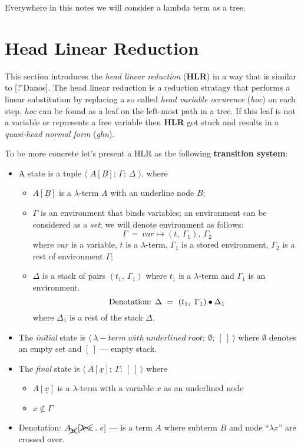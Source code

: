 \documentclass[a4paper, 10pt]{article}
\newcommand{\InContext}[2]{{#1}\left[{#2}\right]}
\begin{document}
Everywhere in this notes we will consider a lambda term as a tree.

\section{Head Linear Reduction}

This section introduces the \emph{head linear reduction} (\textbf{HLR}) in a way that
is similar to [?'Danos].
The head linear reduction is a reduction stratagy that performs a linear substitution
by replacing a so called \emph{head variable occurence} (\emph{hoc}) on each step.
\emph{hoc} can be found as a leaf on the left-most path in a tree. If this leaf is not
a variable or represents a free variable then \textbf{HLR} got stuck and results in a
\emph{quasi-head normal form} (\emph{ghn}).

To be more concrete let's present a HLR as the following \textbf{transition system}:
\begin{itemize}
\item A state is a tuple $\langle$ $A[\underline{B}]$; $\Gamma$; $\Delta$ $\rangle$, where
  \begin{itemize}
  \item $A[\underline{B}]$ is a $\lambda$-term $A$ with an underline node $B$;
  \item $\Gamma$ is an environment that binds variables; an environment can be considered
    as a \emph{set}; we will denote environment as follows:
    $$\Gamma \ = \ var \mapsto (t,\ \Gamma_1),\ \Gamma_2$$ where
    $var$ is a variable, $t$ is a $\lambda$-term, $\Gamma_1$ is a stored environment,
    $\Gamma_2$ is a rest of environment $\Gamma$;
  \item $\Delta$ is a stack of pairs $(t_1, \ \Gamma_1)$ where $t_1$ is a $\lambda$-term and
    $\Gamma_1$ is an environment.
    $$\textnormal{Denotation: } \Delta \ = \ (t_1,\ \Gamma_1) \bullet \Delta_1$$
    where $\Delta_1$ is a rest of the stack $\Delta$.
  \end{itemize}
\item The \emph{initial} state is $\langle\ \lambda-term\ with\ underlined\ root;\ \emptyset;\ [\ ]\ \rangle$
  where $\emptyset$ denotes an empty set and $[\ ]$ --- empty stack.
\item The \emph{final} state is $\langle\ A [\underline{x}];\ \Gamma;\ [\ ]\ \rangle$ where
  \begin{itemize}
  \item $A [\underline{x}]$ is a $\lambda$-term with a variable $x$ as an underlined node
  \item $x \not\in \Gamma$
  \end{itemize}
\item Denotation: $\InContext{A_{\xcancel{B}}}{\xcancel{\lambda\ x}\ .\ e}$ ---
  is a term $A$ where subterm $B$  and node ``$\lambda x$'' are crossed over.
\end{itemize}
\end{document}
